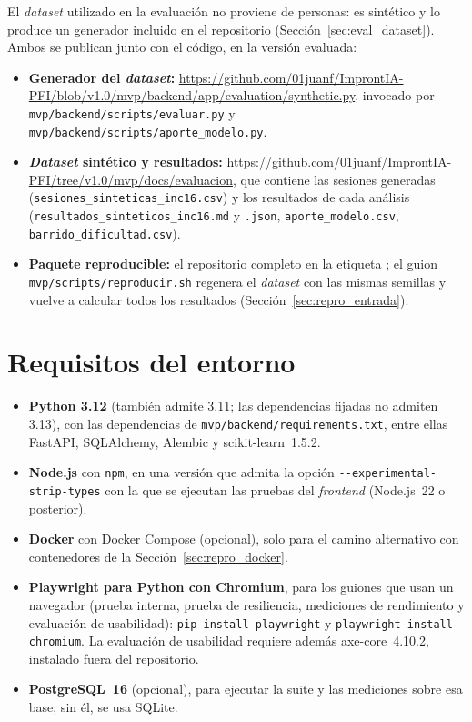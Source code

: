 El \textit{dataset} utilizado en la evaluación no proviene de personas: es sintético y lo produce un generador incluido en el repositorio (Sección~\ref{sec:eval_dataset}). Ambos se publican junto con el código, en la versión evaluada:

\begin{itemize}
    \item \textbf{Generador del \textit{dataset}:} \url{https://github.com/01juanf/ImprontIA-PFI/blob/v1.0/mvp/backend/app/evaluation/synthetic.py}, invocado por \texttt{mvp/backend/scripts/evaluar.py} y \texttt{mvp/backend/scripts/aporte\_modelo.py}.
    \item \textbf{\textit{Dataset} sintético y resultados:} \url{https://github.com/01juanf/ImprontIA-PFI/tree/v1.0/mvp/docs/evaluacion}, que contiene las sesiones generadas (\texttt{sesiones\_sinteticas\_inc16.csv}) y los resultados de cada análisis (\texttt{resultados\_sinteticos\_inc16.md} y \texttt{.json}, \texttt{aporte\_modelo.csv}, \texttt{barrido\_dificultad.csv}).
    \item \textbf{Paquete reproducible:} el repositorio completo en la etiqueta \texttt{\versionmvp}; el guion \texttt{mvp/scripts/reproducir.sh} regenera el \textit{dataset} con las mismas semillas y vuelve a calcular todos los resultados (Sección~\ref{sec:repro_entrada}).
\end{itemize}

\section{Requisitos del entorno}

\begin{itemize}
    \item \textbf{Python 3.12} (también admite 3.11; las dependencias fijadas no admiten 3.13), con las dependencias de \texttt{mvp/backend/requirements.txt}, entre ellas FastAPI, SQLAlchemy, Alembic y scikit-learn~1.5.2.
    \item \textbf{Node.js} con \texttt{npm}, en una versión que admita la opción \verb|--experimental-strip-types| con la que se ejecutan las pruebas del \textit{frontend} (Node.js~22 o posterior).
    \item \textbf{Docker} con Docker Compose (opcional), solo para el camino alternativo con contenedores de la Sección~\ref{sec:repro_docker}.
    \item \textbf{Playwright para Python con Chromium}, para los guiones que usan un navegador (prueba interna, prueba de resiliencia, mediciones de rendimiento y evaluación de usabilidad): \texttt{pip install playwright} y \texttt{playwright install chromium}. La evaluación de usabilidad requiere además axe-core~4.10.2, instalado fuera del repositorio.
    \item \textbf{PostgreSQL~16} (opcional), para ejecutar la suite y las mediciones sobre esa base; sin él, se usa SQLite.
\end{itemize}


